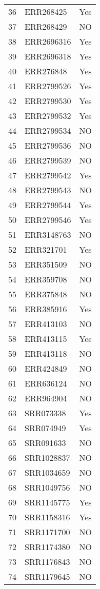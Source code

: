 \begin{table}[ht]
\begin{tabular}{rll}
  36 & ERR268425 & Yes \\ 
  37 & ERR268429 & NO \\ 
  38 & ERR2696316 & Yes \\ 
  39 & ERR2696318 & Yes \\ 
  40 & ERR276848 & Yes \\ 
  41 & ERR2799526 & Yes \\ 
  42 & ERR2799530 & Yes \\ 
  43 & ERR2799532 & Yes \\ 
  44 & ERR2799534 & NO \\ 
  45 & ERR2799536 & NO \\ 
  46 & ERR2799539 & NO \\ 
  47 & ERR2799542 & Yes \\ 
  48 & ERR2799543 & NO \\ 
  49 & ERR2799544 & Yes \\ 
  50 & ERR2799546 & Yes \\ 
  51 & ERR3148763 & NO \\ 
  52 & ERR321701 & Yes \\ 
  53 & ERR351509 & NO \\ 
  54 & ERR359708 & NO \\ 
  55 & ERR375848 & NO \\ 
  56 & ERR385916 & Yes \\ 
  57 & ERR413103 & NO \\ 
  58 & ERR413115 & Yes \\ 
  59 & ERR413118 & NO \\ 
  60 & ERR424849 & NO \\ 
  61 & ERR636124 & NO \\ 
  62 & ERR964904 & NO \\ 
  63 & SRR073338 & Yes \\ 
  64 & SRR074949 & Yes \\ 
  65 & SRR091633 & NO \\ 
  66 & SRR1028837 & NO \\ 
  67 & SRR1034659 & NO \\ 
  68 & SRR1049756 & NO \\ 
  69 & SRR1145775 & Yes \\ 
  70 & SRR1158316 & Yes \\ 
  71 & SRR1171700 & NO \\ 
  72 & SRR1174380 & NO \\ 
  73 & SRR1176843 & NO \\ 
  74 & SRR1179645 & NO \\ 

\end{tabular}
\end{table}
